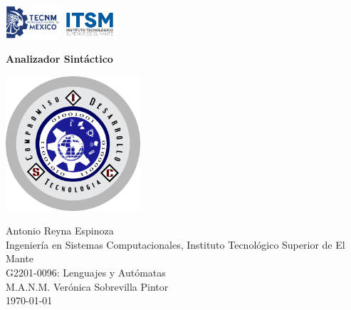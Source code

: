 \begin{titlepage}
        \includegraphics[width=2cm]{img/tecnm.png}
        \hfill
        \includegraphics[width=2cm]{img/itsmante.png}
   \begin{center}
        \vspace*{4cm}
        
        \textbf{Analizador Sintáctico}

       \vspace{1cm}
       \includegraphics[width=5cm]{img/isc.png}
       \vspace{1cm}
       

            
     
       Antonio Reyna Espinoza\\     
       Ingeniería en Sistemas Computacionales, Instituto Tecnológico Superior de El Mante\\
       G2201-0096: Lenguajes y Autómatas\\
       M.A.N.M. Verónica Sobrevilla Pintor\\
       \today
            
   \end{center}
\end{titlepage}